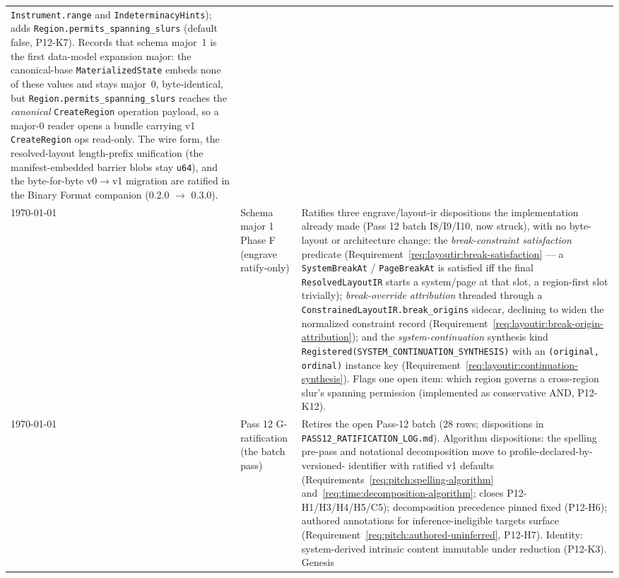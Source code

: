 \documentclass[11pt,letterpaper]{report}
\begin{document}
\begin{longtable}{p{2cm} p{2.5cm} p{9cm}}
  \texttt{Instrument.range} and \texttt{IndeterminacyHints}); adds
  \texttt{Region.permits\_spanning\_slurs} (default false, P12-K7). Records
  that schema major~1 is the first data-model expansion major: the
  canonical-base \texttt{MaterializedState} embeds none of these values and
  stays major~0, byte-identical, but \texttt{Region.permits\_spanning\_slurs}
  reaches the \emph{canonical} \texttt{CreateRegion} operation payload, so a
  major-0 reader opens a bundle carrying v1 \texttt{CreateRegion} ops
  read-only. The wire form, the resolved-layout length-prefix unification
  (the manifest-embedded barrier blobs stay \texttt{u64}), and the
  byte-for-byte v0${\to}$v1 migration are ratified in the Binary Format
  companion (0.2.0 $\rightarrow$ 0.3.0).
  \\
  \today & Schema major 1 Phase F (engrave ratify-only) &
  Ratifies three engrave/layout-ir dispositions the implementation already made
  (Pass 12 batch I8/I9/I10, now struck), with no byte-layout or architecture
  change: the \emph{break-constraint satisfaction} predicate
  (Requirement~\ref{req:layoutir:break-satisfaction} --- a \texttt{SystemBreakAt}
  / \texttt{PageBreakAt} is satisfied iff the final \texttt{ResolvedLayoutIR}
  starts a system/page at that slot, a region-first slot trivially); \emph{break-override
  attribution} threaded through a \texttt{ConstrainedLayoutIR.break\_origins}
  sidecar, declining to widen the normalized constraint record
  (Requirement~\ref{req:layoutir:break-origin-attribution}); and the
  \emph{system-continuation} synthesis kind
  \texttt{Registered(SYSTEM\_CONTINUATION\_SYNTHESIS)} with an
  \texttt{(original,\,ordinal)} instance key
  (Requirement~\ref{req:layoutir:continuation-synthesis}). Flags one open item:
  which region governs a cross-region slur's spanning permission (implemented as
  conservative AND, P12-K12).
  \\
  \today & Pass 12 G-ratification (the batch pass) &
  Retires the open Pass-12 batch (28 rows; dispositions in
  \texttt{PASS12\_RATIFICATION\_LOG.md}). Algorithm dispositions: the spelling
  pre-pass and notational decomposition move to profile-declared-by-versioned-
  identifier with ratified v1 defaults
  (Requirements~\ref{req:pitch:spelling-algorithm}
  and~\ref{req:time:decomposition-algorithm}; closes P12-H1/H3/H4/H5/C5);
  decomposition precedence pinned fixed (P12-H6); authored annotations for
  inference-ineligible targets surface
  (Requirement~\ref{req:pitch:authored-uninferred}, P12-H7). Identity:
  system-derived intrinsic content immutable under reduction (P12-K3). Genesis

\end{longtable}
\end{document}
